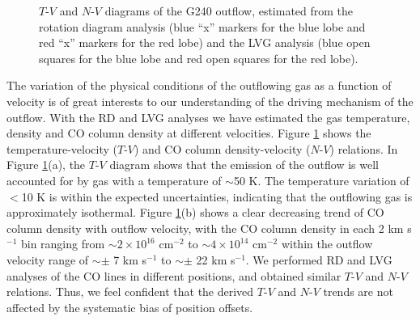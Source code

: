 \begin{figure}[!tbp]
\caption{$T$-$V$ and $N$-$V$ diagrams of the G240 outflow, estimated from the rotation diagram analysis (blue ``x'' markers for the blue lobe and red ``x'' markers for the red lobe) and the LVG analysis (blue open squares for the blue lobe and red open squares for the red lobe). \label{fig:figrelation}}
\end{figure}

The variation of the physical conditions of the outflowing gas as a function of velocity is of great interests to our understanding of the driving mechanism of the outflow. With the RD and LVG analyses we have estimated the gas temperature, density and CO column density at different velocities. Figure \ref{fig:figrelation} shows the temperature-velocity ($T$-$V$) and CO column density-velocity ($N$-$V$) relations. In Figure \ref{fig:figrelation}(a), the $T$-$V$ diagram shows that the emission of the outflow is well accounted for by gas with a temperature of $\sim$50 K. The temperature variation of $<$10 K is within the expected uncertainties, indicating that the outflowing gas is approximately isothermal. Figure \ref{fig:figrelation}(b) shows a clear decreasing trend of CO column density with outflow velocity, with the CO column density in each 2 km s$^{-1}$ bin ranging from $\sim 2 \times 10^{16} $ cm$^{-2}$ to $\sim 4 \times 10^{14}$ cm$^{-2}$ within the outflow velocity range of $\sim \pm$ 7 km s$^{-1}$ to $\sim \pm$ 22 km s$^{-1}$. We performed RD and LVG analyses of the CO lines in different positions, and obtained similar $T$-$V$ and $N$-$V$ relations. Thus, we feel confident that the derived $T$-$V$ and $N$-$V$ trends are not affected by the systematic bias of position offsets.

